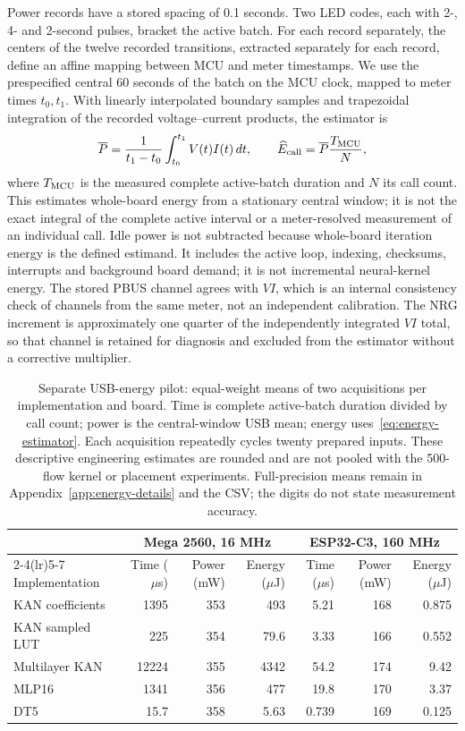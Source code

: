 Power records have a stored spacing of 0.1 seconds. Two LED codes, each with 2-, 4- and 2-second pulses, bracket the active batch. For each record separately, the centers of the twelve recorded transitions, extracted separately for each record, define an affine mapping between MCU and meter timestamps. We use the prespecified central 60 seconds of the batch on the MCU clock, mapped to meter times $t_0,t_1$. With linearly interpolated boundary samples and trapezoidal integration of the recorded voltage--current products, the estimator is
\begin{equation}
\overline P=\frac{1}{t_1-t_0}\int_{t_0}^{t_1}V(t)I(t)\,dt,
\qquad
\widehat E_{\rm call}=\overline P\frac{T_{\rm MCU}}{N},
\label{eq:energy-estimator}
\end{equation}
where $T_{\rm MCU}$ is the measured complete active-batch duration and $N$ its call count. This estimates whole-board energy from a stationary central window; it is not the exact integral of the complete active interval or a meter-resolved measurement of an individual call. Idle power is not subtracted because whole-board iteration energy is the defined estimand. It includes the active loop, indexing, checksums, interrupts and background board demand; it is not incremental neural-kernel energy. The stored PBUS channel agrees with $VI$, which is an internal consistency check of channels from the same meter, not an independent calibration. The NRG increment is approximately one quarter of the independently integrated $VI$ total, so that channel is retained for diagnosis and excluded from the estimator without a corrective multiplier.

\begin{table}[t]
\caption{Separate USB-energy pilot: equal-weight means of two acquisitions per implementation and board. Time is complete active-batch duration divided by call count; power is the central-window USB mean; energy uses~\eqref{eq:energy-estimator}. Each acquisition repeatedly cycles twenty prepared inputs. These descriptive engineering estimates are rounded and are not pooled with the 500-flow kernel or placement experiments. Full-precision means remain in Appendix~\ref{app:energy-details} and the CSV; the digits do not state measurement accuracy.}
\label{tab:energy-pilots}
\centering\small\setlength{\tabcolsep}{5pt}
\begin{tabular}{lrrrrrr}
\toprule
& \multicolumn{3}{c}{Mega 2560, 16 MHz} & \multicolumn{3}{c}{ESP32-C3, 160 MHz}\\
\cmidrule(lr){2-4}\cmidrule(lr){5-7}
Implementation & Time ($\mu$s) & Power (mW) & Energy ($\mu$J) & Time ($\mu$s) & Power (mW) & Energy ($\mu$J)\\
\midrule
KAN coefficients & 1395 & 353 & 493 & 5.21 & 168 & 0.875\\
KAN sampled LUT & 225 & 354 & 79.6 & 3.33 & 166 & 0.552\\
Multilayer KAN & 12224 & 355 & 4342 & 54.2 & 174 & 9.42\\
MLP16 & 1341 & 356 & 477 & 19.8 & 170 & 3.37\\
DT5 & 15.7 & 358 & 5.63 & 0.739 & 169 & 0.125\\
\bottomrule
\end{tabular}
\end{table}

